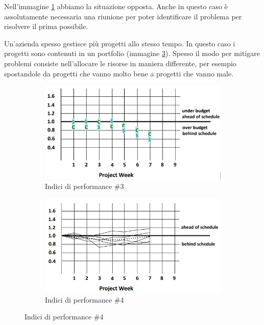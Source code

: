 \noindent Nell'immagine \ref{perfind3} abbiamo la situazione opposta. Anche in questo caso è assolutamente necessaria una riunione per poter identificare il problema per risolvere il prima possibile.

\noindent Un'azienda spesso gestisce più progetti allo stesso tempo. In questo caso i progetti sono contenuti in un portfolio (immagine \ref{perfind4}). Spesso il modo per mitigare problemi consiste nell'allocare le risorse in maniera differente, per esempio spostandole da progetti che vanno molto bene a progetti che vanno male.

\begin{figure}[H]
	\centering
	\begin{subfigure}[b]{0.45\textwidth}
		\centering
		\includegraphics[width=\textwidth]{document/img/performance-indices-3.png}
		\caption{Indici di performance \#3}
		\label{perfind3}
	\end{subfigure}
	\hfill
	\begin{subfigure}[b]{0.45\textwidth}
		\centering
		\includegraphics[width=\textwidth]{document/img/performance-indices-4.png}
		\caption{Indici di performance \#4}
		\label{perfind4}
	\end{subfigure}
\end{figure}

